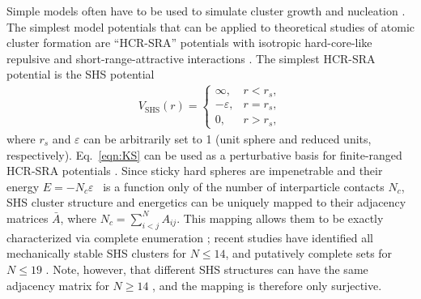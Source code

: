 Simple models often have to be used to simulate cluster growth and nucleation
\autocite{Johnston-1999, Shibuta_Homogeneousnucleationmicrostructure_2015,
Leitold-2016, Sweatman-2016}.  The simplest model potentials that can be
applied to theoretical studies of atomic cluster formation are ``HCR-SRA''
potentials with isotropic hard-core-like repulsive and short-range-attractive
interactions \autocite{baxter68}.  The simplest HCR-SRA potential is the
\ac{SHS} potential \autocite{Yuste_Stickyhardspheres_1993}
\begin{align}
    V_\mathrm{SHS}(r)=\begin{cases}
        \infty, & r < r_s,\\
        -\varepsilon, & r = r_s,\\
        0, & r > r_s,
    \end{cases}
\label{eqn:KS}
\end{align}
where $r_s$ and $\varepsilon$ can be arbitrarily set to 1 (unit sphere and
reduced units, respectively).  Eq.~\ref{eqn:KS} can be used as a perturbative
basis for finite-ranged HCR-SRA potentials \autocite{cochran06,
Holmes-Cerfon_geometricalapproachcomputing_2013}.  Since sticky hard spheres
are impenetrable and their energy $E = -N_c\varepsilon$ ~is a function only of
the number of interparticle contacts $N_c$, \ac{SHS} cluster structure and
energetics can be uniquely mapped to their adjacency matrices $\bar{A}$, where
$N_c=\sum_{i<j}^N A_{ij}$.  This mapping allows them to be exactly
characterized via complete enumeration
\autocite{Arkus_Minimalenergyclusters_2009, Arkus_DerivingFiniteSphere_2011,
Hoy_Structurefinitesphere_2012}; recent studies have identified all
mechanically stable \ac{SHS} clusters for $N \leq 14$, and putatively complete sets
for $N \leq 19$ \autocite{Arkus_Minimalenergyclusters_2009,
Arkus_DerivingFiniteSphere_2011, Hoy_Structurefinitesphere_2012,
Hoy_Structuredynamicsmodel_2015, Holmes-Cerfon_StickySphereClusters_2017,
Kallus_Freeenergysingular_2017}.  Note, however, that different \ac{SHS} structures
can have the same adjacency matrix for $N \geq 14$
\autocite{Holmes-Cerfon_EnumeratingRigidSphere_2016}, and the mapping is
therefore only surjective.

